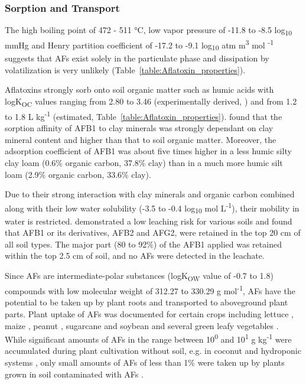 \subsubsection*{Sorption and Transport} \label{subsubchap:sorption}

The high boiling point of 472 - 511 °C, low vapor pressure of -11.8 to -8.5 log\textsubscript{10} mmHg and Henry partition coefficient of -17.2 to -9.1 log\textsubscript{10} atm m\textsuperscript{3} mol \textsuperscript{-1} suggests that AFs exist solely in the particulate phase and dissipation by volatilization is very unlikely (Table~\ref{table:Aflatoxin_properties}). 


Aflatoxins strongly sorb onto soil organic matter such as humic acids \citep{van2006vitro} with logK\textsubscript{OC} values ranging from 2.80 to 3.46 (experimentally derived, \citet{schenzel2012experimentally}) and from 1.2 to 1.8 L kg\textsuperscript{-1} (estimated, Table~\ref{table:Aflatoxin_properties}). \citet{goldberg1985aflatoxin} found that the sorption affinity of AFB1 to clay minerals was strongly dependant on clay mineral content and higher than that to soil organic matter. Moreover, the adsorption coefficient of AFB1 was about five times higher in a less humic silty clay loam  (0.6\% organic carbon, 37.8\% clay) than in a much more humic silt loam (2.9\% organic carbon, 33.6\% clay).


Due to their strong interaction with clay minerals and organic carbon combined along with their low water solubility (-3.5 to -0.4 log\textsubscript{10} mol L\textsuperscript{-1}), their mobility in water is restricted. \citet{goldberg1985aflatoxin} demonstrated a low leaching risk for various soils and found that AFB1 or its derivatives, AFB2 and AFG2, were retained in the top 20 cm of all soil types. The major part (80 to 92\%) of the AFB1 applied was retained within the top 2.5 cm of soil, and no AFs were detected in the leachate.


Since AFs are intermediate-polar substances (logK\textsubscript{OW} value of -0.7 to 1.8) compounds with low molecular weight of 312.27 to 330.29 g mol\textsuperscript{-1}, AFs have the potential to be taken up by plant roots and transported to aboveground plant parts. Plant uptake of AFs was documented for certain crops including lettuce \citep{mertz1981absorption}, maize \citep{mertz1980uptake}, peanut \citep{snigdha2013mechanism, snigdha2015transport}, sugarcane \citep{hariprasad2015natural} and soybean \citep{jones1980toxic} and several green leafy vegetables \citep{hariprasad2013natural}. While significant amounts of AFs in the range between 10\textsuperscript{0} and 10\textsuperscript{1} \textmu g kg\textsuperscript{-1} were accumulated during plant cultivation without soil, e.g. in coconut and hydroponic systems \citep{snigdha2013mechanism, snigdha2015transport, hariprasad2013natural}, only small amounts of AFs of less than 1\% were taken up by plants grown in soil contaminated with AFs \citep{mertz1980uptake}. 

